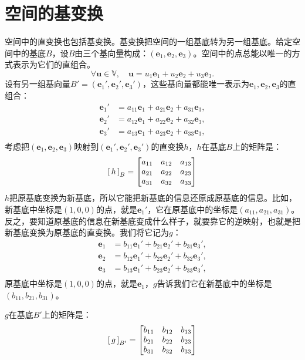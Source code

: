 \documentclass[12pt,UTF8,fontset=none]{ctexbook}
\begin{document}
\section{空间的基变换}
空间中的直变换也包括基变换。基变换把空间的一组基底转为另一组基底。给定空间中的基底$B$，设$B$由三个基向量构成：$(\mathbf{e}_1,\mathbf{e}_2,\mathbf{e}_3)$。空间中的点总能以唯一的方式表示为它们的直组合。
$$\forall \mathbf{u} \in \mathbb{V}, \quad \mathbf{u} = u_1\mathbf{e}_1 + u_2\mathbf{e}_2 + u_3\mathbf{e}_3.  $$
设有另一组基向量$B' = (\mathbf{e}_1',\mathbf{e}_2',\mathbf{e}_3')$，这些基向量都能唯一表示为$\mathbf{e}_1,\mathbf{e}_2,\mathbf{e}_3$的直组合：
\begin{align*}
    \mathbf{e}_1' &= a_{11}\mathbf{e}_1 + a_{21}\mathbf{e}_2 + a_{31}\mathbf{e}_3, \\
    \mathbf{e}_2' &= a_{12}\mathbf{e}_1 + a_{22}\mathbf{e}_2 + a_{32}\mathbf{e}_3, \\
    \mathbf{e}_3' &= a_{13}\mathbf{e}_1 + a_{23}\mathbf{e}_2 + a_{33}\mathbf{e}_3, \\
\end{align*}
考虑把$(\mathbf{e}_1,\mathbf{e}_2,\mathbf{e}_3)$映射到$(\mathbf{e}_1',\mathbf{e}_2',\mathbf{e}_3')$的直变换$h$，$h$在基底$B$上的矩阵是：
$$
\bmat{h}[B] = 
\begin{bmatrix}
    a_{11} & a_{12} & a_{13} \\ a_{21} & a_{22} & a_{23} \\ a_{31} & a_{32} & a_{33}
\end{bmatrix}
$$
$h$把原基底变换为新基底，所以它能把新基底的信息还原成原基底的信息。比如，新基底中坐标是$(1,0,0)$的点，就是$\mathbf{e}_1'$，它在原基底中的坐标是$(a_{11},a_{21},a_{31})$。反之，要知道原基底的信息在新基底变成什么样子，就要靠它的逆映射，也就是把新基底变换为原基底的直变换。我们将它记为$g$：
\begin{align*}
    \mathbf{e}_1 &= b_{11}\mathbf{e}_1' + b_{21}\mathbf{e}_2' + b_{31}\mathbf{e}_3', \\
    \mathbf{e}_2 &= b_{12}\mathbf{e}_1' + b_{22}\mathbf{e}_2' + b_{32}\mathbf{e}_3', \\
    \mathbf{e}_3 &= b_{13}\mathbf{e}_1' + b_{23}\mathbf{e}_2' + b_{33}\mathbf{e}_3', \\
\end{align*}
原基底中坐标是$(1,0,0)$的点，就是$\mathbf{e}_1$，$g$告诉我们它在新基底中的坐标是$(b_{11},b_{21},b_{31})$。

$g$在基底$B'$上的矩阵是：
$$
\bmat{g}[B'] = 
\begin{bmatrix}
    b_{11} & b_{12} & b_{13} \\ b_{21} & b_{22} & b_{23} \\ b_{31} & b_{32} & b_{33}
\end{bmatrix}
$$
\end{document}
